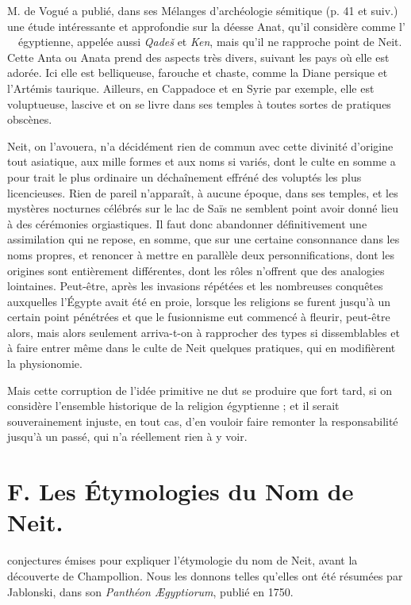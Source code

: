 \documentclass[letterpaper,twocolumn,openany,nodeprecatedcode]{dndbook}
\newcommand*\hieroAAAH{}
\newcommand*\hieroAACD{}
\newcommand*\hieroAALA{}
\newcommand*\hieroABEU{}
\begin{document}
M. de Vogué a publié, dans ses Mélanges d'archéologie sémitique (p. 41 et suiv.) une étude intéressante et approfondie sur la déesse Anat, qu'il considère comme l'$\hieroABEU\:\hieroAACD\allowbreak\:\hieroAAAH\:\hieroAALA$ égyptienne, appelée aussi \emph{Qadeš} et \emph{Ken}, mais qu'il ne rapproche point de Neit. Cette Anta ou Anata prend des aspects très divers, suivant les pays où elle est adorée. Ici elle est belliqueuse, farouche et chaste, comme la Diane persique et l'Artémis taurique. Ailleurs, en Cappadoce et en Syrie par exemple, elle est voluptueuse, lascive et on se livre dans ses temples à toutes sortes de pratiques obscènes.

Neit, on l'avouera, n'a décidément rien de commun avec cette divinité d'origine tout asiatique, aux mille formes et aux noms si variés, dont le culte en somme a pour trait le plus ordinaire un déchaînement effréné des voluptés les plus licencieuses. Rien de pareil n'apparaît, à aucune époque, dans ses temples, et les mystères nocturnes célébrés sur le lac de Saïs ne semblent point avoir donné lieu à des cérémonies orgiastiques. Il faut donc abandonner définitivement une assimilation qui ne repose, en somme, que sur une certaine consonnance dans les noms propres, et renoncer à mettre en parallèle deux personnifications, dont les origines sont entièrement différentes, dont les rôles n'offrent que des analogies lointaines. Peut-être, après les invasions répétées et les nombreuses conquêtes auxquelles l'Égypte avait été en proie, lorsque les religions se furent jusqu'à un certain point pénétrées et que le fusionnisme eut commencé à fleurir, peut-être alors, mais alors seulement arriva-t-on à rapprocher des types si dissemblables et à faire entrer même dans le culte de Neit quelques pratiques, qui en modifièrent la physionomie.

Mais cette corruption de l'idée primitive ne dut se produire que fort tard, si on considère l'ensemble historique de la religion égyptienne ; et il serait souverainement injuste, en tout cas, d'en vouloir faire remonter la responsabilité jusqu'à un passé, qui n'a réellement rien à y voir.
\clearpage
\section{F. Les Étymologies du Nom de Neit.}
 conjectures émises pour expliquer l'étymologie du nom de Neit, avant la découverte de Champollion. Nous les donnons telles qu'elles ont été résumées par Jablonski, dans son \emph{Panthéon Ægyptiorum}, publié en 1750.
\end{document}
